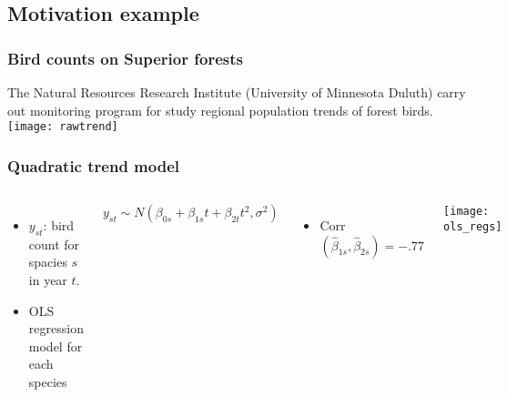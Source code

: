 \documentclass[9pt]{beamer}\usepackage[]{graphicx}\usepackage[]{color}
\begin{document}
\subsection{Motivation example}
\begin{frame}
\frametitle{Bird counts on Superior forests}
 The Natural Resources Research Institute (University of Minnesota Duluth) carry out monitoring program for study regional population trends of forest birds.
            \texttt{[image: rawtrend]}
\end{frame}

\begin{frame}
\frametitle{Quadratic trend model}
  \begin{columns}[T] %

\begin{itemize}
  \item $y_{st}$: bird count for spacies $s$ in year $t$.
  \item OLS regression model for each species
\end{itemize}

\[
y_{st}  \sim  N(\beta_{0s} + \beta_{1s} t + \beta_{2t}t^2, \sigma^2)
\]

\vspace{.5cm}

\begin{itemize}
  \item Corr$(\hat\beta_{1s}, \hat\beta_{2s}) = -.77$    
\end{itemize}

    \texttt{[image: ols\_regs]}
  \end{columns}

\end{frame}
\end{document}
